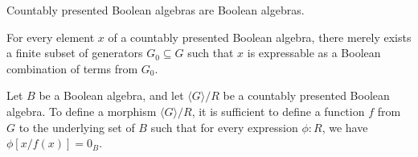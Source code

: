 \documentclass{../util/zariski-small}
\begin{document}
\begin{remark}
  Countably presented Boolean algebras are Boolean algebras. 
\end{remark}
\begin{remark}
  For every element $x$ of a countably presented Boolean algebra, 
  there merely exists a finite subset of generators $G_0\subseteq G$ such that $x$ is expressable 
  as a Boolean combination of terms from $G_0$. 
\end{remark}
\begin{remark}\label{rmkMorphismsOutOfQuotient}
  Let $B$ be a Boolean algebra, and let $\langle G \rangle / R$ be a countably presented Boolean algebra. 
  To define a morphism $\langle G \rangle / R$, it is sufficient to define a function $f$ from $G$ 
  to the underlying set of $B$ such that for every expression $\phi:R$, we have
  $\phi[x/f(x)] = 0_B$. 
\end{remark}
\end{document}
